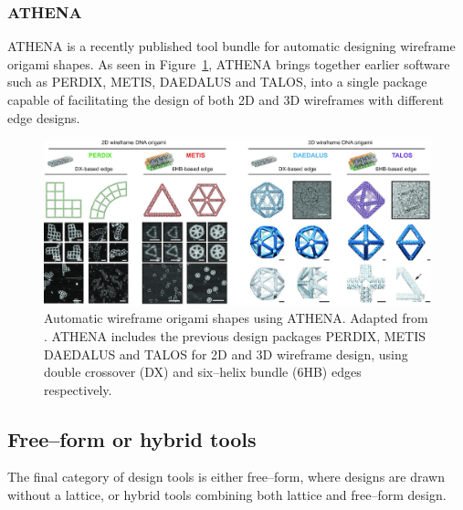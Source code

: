 \subsubsection{ATHENA}

 ATHENA is a recently published tool bundle for automatic designing wireframe origami shapes. As seen in Figure~\ref{fig:athena}, ATHENA brings together earlier software such as PERDIX, METIS, DAEDALUS and TALOS, into a single package capable of facilitating the design of both 2D and 3D wireframes with different edge designs.


\begin{figure}[ht]
  \begin{center}
    \includegraphics[width=\textwidth]{figures/athena.jpeg}
    \caption{Automatic wireframe origami shapes using ATHENA. Adapted from \cite{athena}. ATHENA includes the previous design packages PERDIX, METIS DAEDALUS and TALOS for 2D and 3D wireframe design, using double crossover (DX) and six--helix bundle (6HB) edges respectively. }
    \label{fig:athena}
  \end{center}
\end{figure}


\subsection{Free--form or hybrid tools}
The final category of design tools is either free--form, where designs are drawn without a lattice, or hybrid tools combining both lattice and free--form design. 


